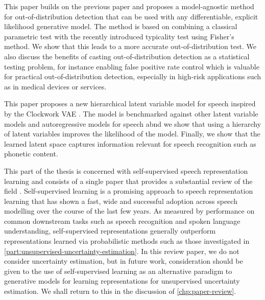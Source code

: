 This paper builds on the previous paper and proposes a model-agnostic method for out-of-distribution detection that can be used with any differentiable, explicit likelihood generative model. The method is based on combining a classical parametric test with the recently introduced typicality test using Fisher's method. We show that this leads to a more accurate out-of-distribution test. We also discuss the benefits of casting out-of-distribution detection as a statistical testing problem, for instance enabling false positive rate control which is valuable for practical out-of-distribution detection, especially in high-risk applications such as in medical devices or services.


This paper proposes a new hierarchical latent variable model for speech inspired by the Clockwork VAE \cite{saxena_clockwork_2021}. The model is benchmarked against other latent variable models and autoregressive models for speech abnd we show that using a hierarchy of latent variables improves the likelihood of the model. Finally, we show that the learned latent space captures information relevant for speech recognition such as phonetic content.


This part of the thesis is concerned with self-supervised speech representation learning and consists of a single paper that provides a substantial review of the field \cite{mohamed_selfsupervised_2022}. 
Self-supervised learning is a promising approach to speech representation learning that has shown a fast, wide and successful adoption across speech modelling over the course of the last few years. 
As measured by performance on common downstream tasks such as speech recognition and spoken language understanding, self-supervised representations generally outperform representations learned via probabilistic methods such as those investigated in \cref{part:unsupervised-uncertainty-estimation}. 
In this review paper, we do not consider uncertainty estimation, but in future work, consideration should be given to the use of self-supervised learning as an alternative paradigm to generative models for learning representations for unsupervised uncertainty estimation. We shall return to this in the discussion of \cref{chp:paper-review}.



